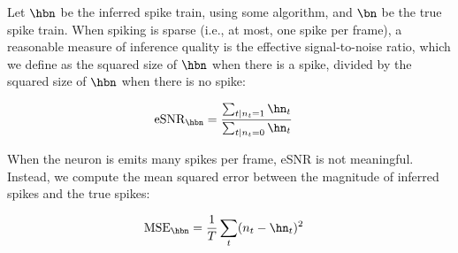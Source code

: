 Let $\hbn$ be the inferred spike train, using some algorithm, and $\bn$ be the true spike train.  When spiking is sparse (i.e., at most, one spike per frame), a reasonable measure of inference quality is the effective signal-to-noise ratio, which we define as the squared size of $\hbn$ when there is a spike, divided by the squared size of $\hbn$ when there is no spike:

\begin{align}
	\text{eSNR}_{\hbn} &= \frac{\sum_{t | n_t=1} \hn_t}{\sum_{t | n_t=0} \hn_t} \label{eq:SNR} %
\end{align}

When the neuron is emits many spikes per frame, eSNR is not meaningful.  Instead, we compute the mean squared error between the magnitude of inferred spikes and the true spikes:


\begin{align}
	\text{MSE}_{\hbn} &= \frac{1}{T} \sum_t (n_t - \hn_t)^2 \label{eq:MSE}
\end{align}

